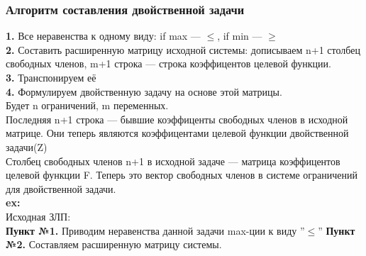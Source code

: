 \subsubsection{Алгоритм составления двойственной задачи}
\textbf{1.} Все неравенства к одному виду: if max --- $\leq$, if min --- $\geq$\\
\textbf{2.} Составить расширенную матрицу исходной системы: дописываем n+1 столбец свободных членов, m+1 строка --- строка коэффицентов целевой функции.\\
\textbf{3.} Транспонируем её\\
\textbf{4.} Формулируем двойственную задачу на основе этой матрицы. \\
Будет n ограничений, m переменных. \\
Последняя n+1 строка --- бывшие коэффиценты свободных членов в исходной матрице. Они теперь являются коэффицентами целевой функции двойственной задачи(Z)\\
Столбец свободных членов n+1 в исходной задаче --- матрица коэффицентов целевой функции F. Теперь это вектор свободных членов в системе ограничений для двойственной задачи.\\
\textbf{ex:} \\
Исходная ЗЛП:\\
\textbf{Пункт №1.} Приводим неравенства данной задачи max-ции к виду ''$\leq$''
\textbf{Пункт №2.} Составляем расширенную матрицу системы.\\
